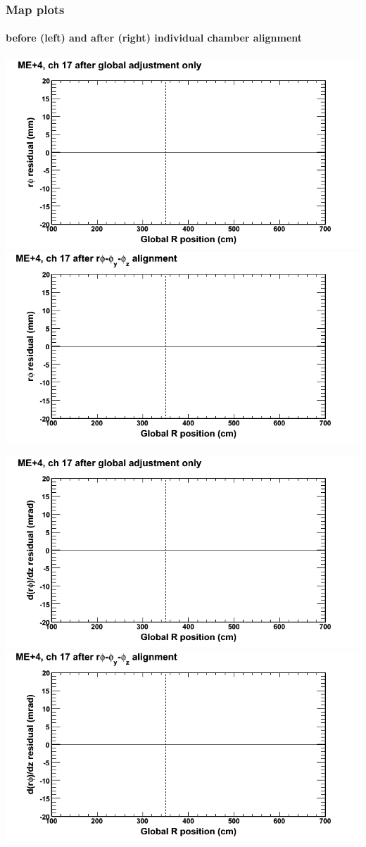 \documentclass[compress]{beamer}
\begin{document}
\begin{frame}
\frametitle{Map plots}
\framesubtitle{before (left) and after (right) individual chamber alignment}
\includegraphics[width=0.5\linewidth]{ringmapplots_3dof/before_CSCvsr_mep4ch17_x.png} \includegraphics[width=0.5\linewidth]{ringmapplots_3dof/after_CSCvsr_mep4ch17_x.png}

\includegraphics[width=0.5\linewidth]{ringmapplots_3dof/before_CSCvsr_mep4ch17_dxdz.png} \includegraphics[width=0.5\linewidth]{ringmapplots_3dof/after_CSCvsr_mep4ch17_dxdz.png}
\end{frame}
\end{document}
